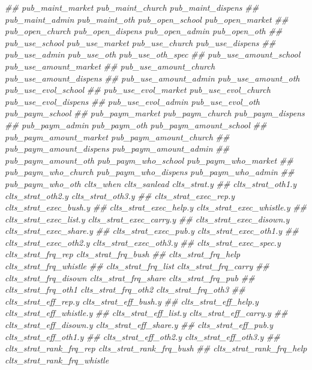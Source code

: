 \documentclass[
]{article}
\newenvironment{Shaded}{\begin{snugshade}}{\end{snugshade}}
\newcommand{\CommentTok}[1]{\textcolor[rgb]{0.56,0.35,0.01}{\textit{#1}}}
\begin{document}
\begin{Shaded}
\begin{Highlighting}[]
\CommentTok{##      pub_maint_market pub_maint_church pub_maint_dispens}
\CommentTok{##      pub_maint_admin pub_maint_oth pub_open_school pub_open_market}
\CommentTok{##      pub_open_church pub_open_dispens pub_open_admin pub_open_oth}
\CommentTok{##      pub_use_school pub_use_market pub_use_church pub_use_dispens}
\CommentTok{##      pub_use_admin pub_use_oth pub_use_oth_spec}
\CommentTok{##      pub_use_amount_school pub_use_amount_market}
\CommentTok{##      pub_use_amount_church pub_use_amount_dispens}
\CommentTok{##      pub_use_amount_admin pub_use_amount_oth pub_use_evol_school}
\CommentTok{##      pub_use_evol_market pub_use_evol_church pub_use_evol_dispens}
\CommentTok{##      pub_use_evol_admin pub_use_evol_oth pub_paym_school}
\CommentTok{##      pub_paym_market pub_paym_church pub_paym_dispens}
\CommentTok{##      pub_paym_admin pub_paym_oth pub_paym_amount_school}
\CommentTok{##      pub_paym_amount_market pub_paym_amount_church}
\CommentTok{##      pub_paym_amount_dispens pub_paym_amount_admin}
\CommentTok{##      pub_paym_amount_oth pub_paym_who_school pub_paym_who_market}
\CommentTok{##      pub_paym_who_church pub_paym_who_dispens pub_paym_who_admin}
\CommentTok{##      pub_paym_who_oth clts_when clts_sanlead clts_strat.y}
\CommentTok{##      clts_strat_oth1.y clts_strat_oth2.y clts_strat_oth3.y}
\CommentTok{##      clts_strat_exec_rep.y clts_strat_exec_bush.y}
\CommentTok{##      clts_strat_exec_help.y clts_strat_exec_whistle.y}
\CommentTok{##      clts_strat_exec_list.y clts_strat_exec_carry.y}
\CommentTok{##      clts_strat_exec_disown.y clts_strat_exec_share.y}
\CommentTok{##      clts_strat_exec_pub.y clts_strat_exec_oth1.y}
\CommentTok{##      clts_strat_exec_oth2.y clts_strat_exec_oth3.y}
\CommentTok{##      clts_strat_exec_spec.y clts_strat_frq_rep clts_strat_frq_bush}
\CommentTok{##      clts_strat_frq_help clts_strat_frq_whistle}
\CommentTok{##      clts_strat_frq_list clts_strat_frq_carry}
\CommentTok{##      clts_strat_frq_disown clts_strat_frq_share clts_strat_frq_pub}
\CommentTok{##      clts_strat_frq_oth1 clts_strat_frq_oth2 clts_strat_frq_oth3}
\CommentTok{##      clts_strat_eff_rep.y clts_strat_eff_bush.y}
\CommentTok{##      clts_strat_eff_help.y clts_strat_eff_whistle.y}
\CommentTok{##      clts_strat_eff_list.y clts_strat_eff_carry.y}
\CommentTok{##      clts_strat_eff_disown.y clts_strat_eff_share.y}
\CommentTok{##      clts_strat_eff_pub.y clts_strat_eff_oth1.y}
\CommentTok{##      clts_strat_eff_oth2.y clts_strat_eff_oth3.y}
\CommentTok{##      clts_strat_rank_frq_rep clts_strat_rank_frq_bush}
\CommentTok{##      clts_strat_rank_frq_help clts_strat_rank_frq_whistle}

\end{Highlighting}
\end{Shaded}
\end{document}

